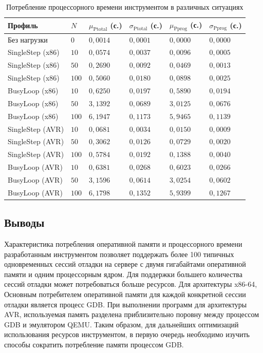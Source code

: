 \documentclass[a4paper,article,14pt]{extarticle}
\begin{document}
\begin{table}[ht]
\small
    \begin{tabular}{|p{3cm}|p{1cm}|p{2.5cm}|p{2.5cm}|p{2.5cm}|p{2.5cm}|}
    \hline
    Профиль & $N$ & $\mu_\mathrm{Ptotal}$ (с.) & $\sigma_\mathrm{Ptotal}$ (с.) &
    $\mu_\mathrm{Pprog}$ (с.) & $\sigma_\mathrm{Pprog}$ (с.) \\
    \hline
Без нагрузки & $0$ & $0{,}0014$ & $0{,}0001$ & $0{,}0000$ & $0{,}0000$ \\ \hline
SingleStep (x86) & $10$ & $0{,}0574$ & $0{,}0037$ & $0{,}0096$ & $0{,}0005$ \\ \hline
SingleStep (x86) & $50$ & $0{,}2690$ & $0{,}0092$ & $0{,}0469$ & $0{,}0013$ \\ \hline
SingleStep (x86) & $100$ & $0{,}5060$ & $0{,}0180$ & $0{,}0898$ & $0{,}0025$ \\ \hline
BusyLoop (x86) & $10$ & $0{,}6250$ & $0{,}0197$ & $0{,}5890$ & $0{,}0194$ \\ \hline
BusyLoop (x86) & $50$ & $3{,}1392$ & $0{,}0689$ & $3{,}0125$ & $0{,}0676$ \\ \hline
BusyLoop (x86) & $100$ & $6{,}1947$ & $0{,}1173$ & $5{,}9465$ & $0{,}1139$ \\ \hline
SingleStep (AVR) & $10$ & $0{,}0681$ & $0{,}0034$ & $0{,}0150$ & $0{,}0009$ \\ \hline
SingleStep (AVR) & $50$ & $0{,}3062$ & $0{,}0126$ & $0{,}0729$ & $0{,}0020$ \\ \hline
SingleStep (AVR) & $100$ & $0{,}5784$ & $0{,}0192$ & $0{,}1388$ & $0{,}0040$ \\ \hline
BusyLoop (AVR) & $10$ & $0{,}6381$ & $0{,}0268$ & $0{,}6023$ & $0{,}0266$ \\ \hline
BusyLoop (AVR) & $50$ & $3{,}1596$ & $0{,}0614$ & $3{,}0254$ & $0{,}0602$ \\ \hline
BusyLoop (AVR) & $100$ & $6{,}1798$ & $0{,}1352$ & $5{,}9399$ & $0{,}1267$ \\ \hline
    \end{tabular}
\caption{\label{table:cpumeasurements}Потребление процессорного времени инструментом в различных ситуациях}
\normalsize
\end{table}

\subsection{Выводы}

Характеристика потребления оперативной памяти и процессорного времени разработанным инструментом позволяет поддержать более 100 типичных одновременных сессий отладки на сервере с двумя гигабайтами оперативной памяти и одним процессорным ядром. Для поддержки большего количества сессий отладки может потребоваться больше ресурсов. Для архитектуры x86-64, Основным потребителем оперативной памяти для каждой конкретной сессии отладки является процесс GDB. При выполнении программ для архитектуры AVR, используемая память разделена приблизительно поровну между процессом GDB и эмулятором  QEMU. Таким образом, для дальнейших оптимизаций использования ресурсов инструментом, в первую очередь необходимо изучить способы сократить потребление памяти процессом GDB.
\end{document}
